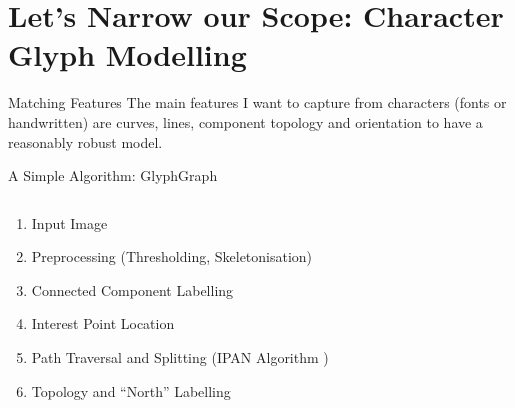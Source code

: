 
\section{Let's Narrow our Scope: Character Glyph Modelling}

\begin{frame}{Matching Features}
	The main features I want to capture from characters (fonts or handwritten) are \alert{curves}, \alert{lines}, \alert{component topology} and \alert{orientation} to have a reasonably robust model.
\end{frame}

\begin{frame}{A Simple Algorithm: GlyphGraph}
\begin{columns}
	\begin{column}{0.4\linewidth}
		\only<4>{\vspace{-1.5em}}
		\begin{enumerate}[<alert@+>]
			\item Input Image
			\item Preprocessing (Thresholding, Skeletonisation)
			\item Connected Component Labelling
			\item Interest Point Location
			\item Path Traversal and Splitting (IPAN Algorithm \cite{PathCurvature})
			\item Topology and ``North'' Labelling
		\end{enumerate}
	\end{column}
	\begin{column}{0.6\linewidth}
		\def\pixels{
			{0,0,0,0,0,0,0,0,0,0,0},
			{0,0,0,0,1,1,1,0,0,0,0},
			{0,0,0,1,0,0,0,1,0,0,0},
			{0,0,1,0,0,0,0,0,1,0,0},
			{0,0,1,0,0,0,0,0,1,0,0},
			{0,0,1,0,1,1,1,0,1,0,0},
			{0,0,1,0,0,0,0,0,1,0,0},
			{0,0,1,0,0,0,0,0,1,0,0},
			{0,0,0,1,0,0,0,1,0,0,0},
			{0,0,0,0,1,1,1,0,0,0,0},
			{0,0,0,0,0,0,0,0,0,0,0}%
		}
		\def\comps{
			{0,0,0,0,0,0,0,0,0,0,0},
			{0,0,0,0,2,2,2,0,0,0,0},
			{0,0,0,2,0,0,0,2,0,0,0},
			{0,0,2,0,0,0,0,0,2,0,0},
			{0,0,2,0,0,0,0,0,2,0,0},
			{0,0,2,0,3,3,3,0,2,0,0},
			{0,0,2,0,0,0,0,0,2,0,0},
			{0,0,2,0,0,0,0,0,2,0,0},
			{0,0,0,2,0,0,0,2,0,0,0},
			{0,0,0,0,2,2,2,0,0,0,0},
			{0,0,0,0,0,0,0,0,0,0,0}%
		}
			
	

\end{column}
\end{columns}
\end{frame}
